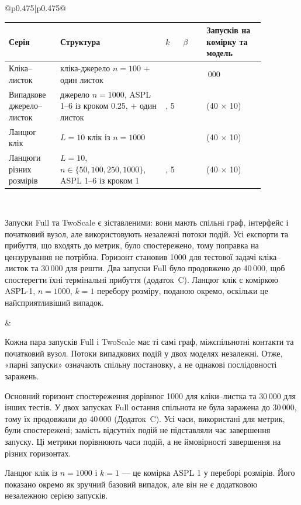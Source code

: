 \documentclass[11pt]{article}
\newcommand{\Full}{\textnormal{Full}}
\newcommand{\TS}{\textnormal{TwoScale}}
\begin{document}
\begin{longtable}{@{}p{0.475\textwidth}|p{0.475\textwidth}@{}}
\begin{minipage}[t]{\linewidth}
\begin{minipage}{\linewidth}
\small
\setlength{\tabcolsep}{3pt}\begin{tabular}{>{\raggedright\arraybackslash}p{0.17\linewidth}>{\raggedright\arraybackslash}p{0.36\linewidth}>{\raggedright\arraybackslash}p{0.06\linewidth}>{\raggedright\arraybackslash}p{0.08\linewidth}>{\raggedright\arraybackslash}p{0.2\linewidth}}
\toprule
Серія & Структура & $k$ & $\beta$ & Запусків на комірку та модель\\
\midrule
Кліка--листок & кліка-джерело $n=100$ $+$ один листок & 2 & 0.005 & 10\,000\\
Випадкове джерело--листок & джерело $n=1000$, ASPL 1--6 із кроком 0.25, $+$ один листок & 1, 5 & 0.003 & 400 (40 $\times$ 10)\\
Ланцюг клік & $L=10$ клік із $n=1000$ & 1 & 0.003 & 400 (40 $\times$ 10)\\
Ланцюги різних розмірів & $L=10$, $n\in\{50,100,250,1000\}$, ASPL 1--6 із кроком 1 & 1, 5 & 0.003 & 400 (40 $\times$ 10)\\
\bottomrule
\end{tabular}
\end{minipage}\par
\end{minipage} \\[5mm]
\begin{minipage}[t]{\linewidth}
Запуски \Full{} та \TS{} є зіставленими: вони мають спільні граф, інтерфейс і початковий вузол, але використовують незалежні потоки подій. Усі експорти та прибуття, що входять до метрик, було спостережено, тому поправка на цензурування не потрібна. Горизонт становив 1000 для тестової задачі кліка--листок та 30\,000 для решти. Два запуски \Full{} було продовжено до 40\,000, щоб спостерегти їхні термінальні прибуття (додаток~C). Ланцюг клік є коміркою ASPL-1, $n=1000$, $k=1$ перебору розміру, поданою окремо, оскільки це найсприятливіший випадок.
\end{minipage} &
\begin{minipage}[t]{\linewidth}
Кожна пара запусків \Full{} і \TS{} має ті самі граф, міжспільнотні контакти та початковий вузол. Потоки випадкових подій у двох моделях незалежні. Отже, «парні запуски» означають спільну постановку, а не однакові послідовності заражень.
\par Основний горизонт спостереження дорівнює 1000 для кліки--листка та 30\,000 для інших тестів. У двох запусках \Full{} остання спільнота не була заражена до 30\,000, тому їх продовжили до 40\,000 (Додаток~C). Усі часи, використані для метрик, були спостережені; замість відсутніх подій не підставляли час завершення запуску. Ці метрики порівнюють часи подій, а не ймовірності завершення на різних горизонтах.
\par Ланцюг клік із $n=1000$ і $k=1$ --- це комірка ASPL 1 у переборі розмірів. Його показано окремо як зручний базовий випадок, але він не є додатковою незалежною серією запусків.
\end{minipage} \\[5mm]
\begin{minipage}[t]{\linewidth}

\end{minipage}
\end{longtable}
\end{document}
